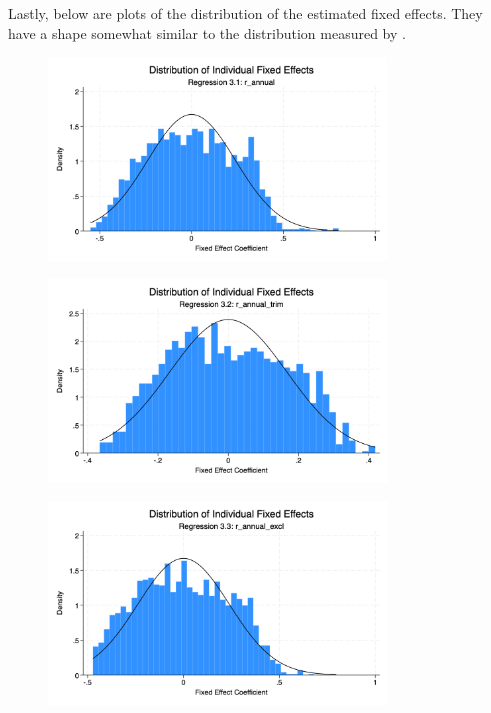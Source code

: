 


 

\par Lastly, below are plots of the distribution of the estimated fixed effects. They have a shape somewhat similar to the distribution measured by \cite{aflgdmlp20}.


\begin{figure}[htbp]
\centering
\includegraphics[width=0.8\textwidth]{../Figures/fixed_effects_hist_reg3_1.png}
\end{figure}

\begin{figure}[htbp]
\centering
\includegraphics[width=0.8\textwidth]{../Figures/fixed_effects_hist_reg3_2.png}
\end{figure}

\begin{figure}[htbp]
\centering
\includegraphics[width=0.8\textwidth]{../Figures/fixed_effects_hist_reg3_3.png}
\end{figure}

